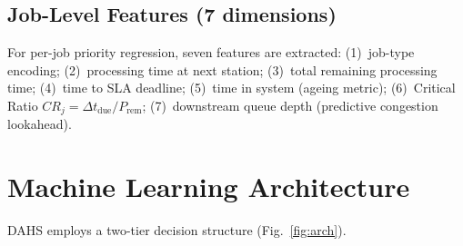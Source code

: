 \documentclass[3p,times]{elsarticle}
\begin{document}
\subsection{Job-Level Features (7 dimensions)}
\label{sec:job_feat}

For per-job priority regression, seven features are extracted:
(1)~job-type encoding;
(2)~processing time at next station;
(3)~total remaining processing time;
(4)~time to SLA deadline;
(5)~time in system (ageing metric);
(6)~Critical Ratio $CR_j = \Delta t_{\mathrm{due}}/P_{\mathrm{rem}}$;
(7)~downstream queue depth (predictive congestion lookahead).

\section{Machine Learning Architecture}
\label{sec:ml}

DAHS employs a two-tier decision structure (Fig.~\ref{fig:arch}).
\end{document}
